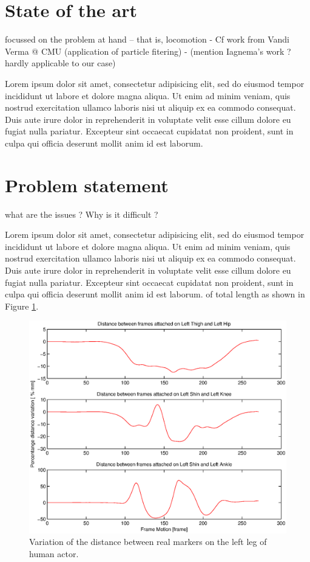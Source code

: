 \documentclass[a4paper, 10pt, conference]{ieeeconf}
\begin{document}
\section{State of the art}
focussed on the problem at hand -- that is, locomotion
- Cf work from Vandi Verma @ CMU (application of particle fitering)
- (mention Iagnema's work ? hardly applicable to our case)


Lorem ipsum dolor sit amet, consectetur adipisicing elit, sed do eiusmod tempor incididunt ut labore et dolore magna aliqua. Ut enim ad minim veniam, quis nostrud exercitation ullamco laboris nisi ut aliquip ex ea commodo consequat. Duis aute irure dolor in reprehenderit in voluptate velit esse cillum dolore eu fugiat nulla pariatur. Excepteur sint occaecat cupidatat non proident, sunt in culpa qui officia deserunt mollit anim id est laborum.

\section{Problem statement}
what are the issues ? Why is it difficult ?


Lorem ipsum dolor sit amet, consectetur adipisicing elit, sed do eiusmod tempor incididunt ut labore et dolore magna aliqua. Ut enim ad minim veniam, quis nostrud exercitation ullamco laboris nisi ut aliquip ex ea commodo consequat. Duis aute irure dolor in reprehenderit in voluptate velit esse cillum dolore eu fugiat nulla pariatur. Excepteur sint occaecat cupidatat non proident, sunt in culpa qui officia deserunt mollit anim id est laborum. of total length as shown in Figure \ref{fig:distVariation}.
\begin{figure}[b]
		\includegraphics[width=\linewidth]{Figures/distVariation.eps} 
		\caption{Variation of the distance between real markers on the left leg of human actor.}
		\label{fig:distVariation}
\end{figure}
\end{document}
